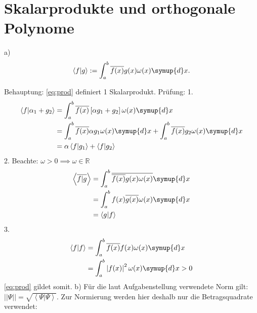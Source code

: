 \section{Skalarprodukte und orthogonale Polynome}
\label{sec:a1}

a) \newline
\begin{equation}
  \left< f|g \right>  := \int_a^b \overline{f(x)} g(x) \omega(x) \symup{d}x .
  \label{eq:prod}
\end{equation}

Behauptung: \eqref{eq:prod} definiert 1 Skalarprodukt.
Prüfung:
1.
\begin{align*}
  \left<f|\alpha _1 +g_2 \right>  &= \int_a^b \overline{f(x)} \left[\alpha g_1 +g_2 \right] \omega(x) \symup{d}x \\
                                  &= \int_a^b \overline{f(x)} \alpha g_1 \omega(x) \symup{d}x + \int_a^b \overline{f(x)} g_2 \omega(x) \symup{d}x \\
                                  &= \alpha \left<f|g_1\right>+\left<f|g_2\right>
\end{align*}
2. Beachte: $\omega > 0 \implies \omega \in \mathbb{R}$
\begin{align*}
  \left< \overline{f|g} \right> &= \int_a^b \overline{\overline{f(x)}g(x)\omega(x)}\symup{d}x \\
                                &=  \int_a^b f(x) \overline{g(x)}\omega(x)\symup{d}x \\
                                &= \left<g|f\right>
\end{align*}
3.
\begin{align*}
  \left<f|f\right> &= \int_a^b \overline{f(x)}f(x)\omega(x)\symup{d}x \\
                   &= \int_a^b \left|f(x)\right|^2 \omega(x) \symup{d}x > 0
\end{align*}
\eqref{eq:prod} gildet somit.\newline
\newline
b) \newline
Für die laut Aufgabenstellung verwendete Norm gilt: $||\Psi|| = \sqrt{\left< \Psi|\Psi\right>}.$ Zur Normierung werden hier deshalb nur die Betragsquadrate verwendet:
